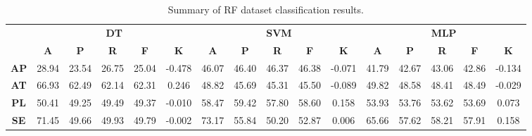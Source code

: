 \begin{landscape}
\begin{table}[htbp]
\footnotesize
\centering
\caption{Summary of RF dataset classification results.}
\label{tab:base_female}
\begin{tabular}{|c|c|c|c|c|c|c|c|c|c|c|c|c|c|c|c|}
\hline
\multirow{2}{*}{}	& \multicolumn{5}{c|}{\textbf{DT}}												& \multicolumn{5}{c|}{\textbf{SVM}}												& \multicolumn{5}{c|}{\textbf{MLP}}												\\ \cline{2-16} 
					& \textbf{A}	& \textbf{P}	& \textbf{R}	& \textbf{F}	& \textbf{K}	& \textbf{A}	& \textbf{P}	& \textbf{R}	& \textbf{F}	& \textbf{K}	& \textbf{A}	& \textbf{P}	& \textbf{R}	& \textbf{F}	& \textbf{K}	\\ \hline
\textbf{AP}			& 28.94			& 23.54			& 26.75			& 25.04			& -0.478			& 46.07			& 46.40			& 46.37			& 46.38			& -0.071			& 41.79			& 42.67			& 43.06			& 42.86			& -0.134			\\ \hline
\textbf{AT}			& 66.93			& 62.49			& 62.14			& 62.31			& 0.246			& 48.82			& 45.69			& 45.31			& 45.50			& -0.089			& 49.82			& 48.58			& 48.41			& 48.49			& -0.029			\\ \hline
\textbf{PL}			& 50.41			& 49.25			& 49.49			& 49.37			& -0.010			& 58.47			& 59.42			& 57.80			& 58.60			& 0.158			& 53.93			& 53.76			& 53.62			& 53.69			& 0.073			\\ \hline
\textbf{SE}			& 71.45			& 49.66			& 49.93			& 49.79			& -0.002			& 73.17			& 55.84			& 50.20			& 52.87			& 0.006			& 65.66			& 57.62			& 58.21			& 57.91			& 0.158			\\ \hline
\end{tabular}
\end{table}
\end{landscape}